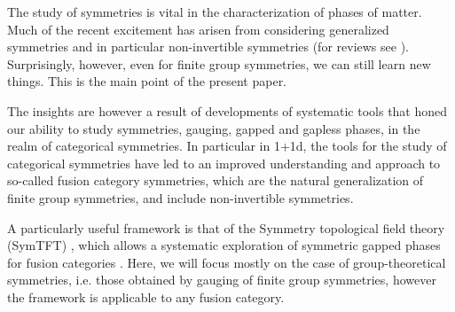 \documentclass[aps,twocolumn,prx,floatfix,preprintnumbers, nofootinbib,10pt]{revtex4-2}
\numberwithin{equation}{section}
\theoremstyle{definition}
\newcommand{\Z}{{\mathbb Z}}
\newcommand{\cZ}{\mathcal{Z}}
\newcommand{\Rep}{\mathsf{Rep}}
\newcommand{\TY}{\mathsf{TY}}
\begin{document}




The study of symmetries is vital in the characterization of phases of matter. 
Much of the recent excitement has arisen from considering generalized symmetries \cite{Gaiotto:2014kfa} and in particular non-invertible symmetries (for reviews see \cite{Schafer-Nameki:2023jdn, Shao:2023gho, Bhardwaj:2023kri}). Surprisingly, however, even for finite group symmetries, we can still learn new things. This is the main point of the present paper. 

The insights are however a result of developments of  systematic tools that honed our ability to study symmetries, gauging, gapped and gapless phases, in the realm of categorical symmetries. In particular in 1+1d, the tools for the study of categorical symmetries have led to an improved understanding and approach to so-called fusion category symmetries, which are the natural generalization of finite group symmetries, and include non-invertible symmetries. 

A particularly useful framework is that of the Symmetry topological field theory (SymTFT) \cite{Ji:2019jhk,  Gaiotto:2020iye, Apruzzi:2021nmk, Freed:2022qnc}, which allows a systematic exploration of symmetric gapped phases for fusion categories \cite{Bhardwaj:2024qrf,  Bhardwaj:2024wlr, Bhardwaj:2024kvy, Chatterjee:2024ych, Warman:2024lir, Bottini:2025hri}. Here, we will focus mostly on the case of group-theoretical symmetries, i.e. those obtained by gauging of finite group symmetries, however the framework is applicable to any fusion category. 
\end{document}
